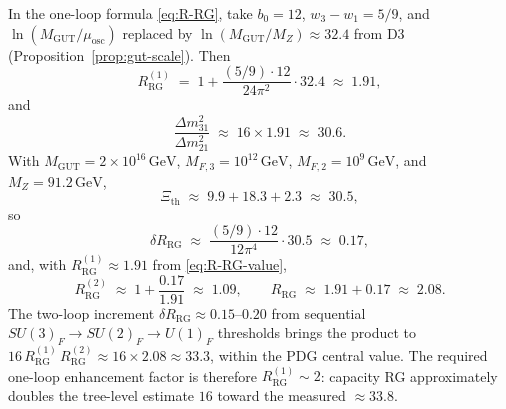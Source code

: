 \begin{proposition}
\label{prop:R-RG-numeric}
In the one-loop formula \eqref{eq:R-RG}, take $b_0=12$,
$w_3-w_1=5/9$, and $\ln(M_{\mathrm{GUT}}/\mu_{\mathrm{osc}})$ replaced by
$\ln(M_{\mathrm{GUT}}/M_Z)\approx 32.4$ from D3
(Proposition~\ref{prop:gut-scale}). Then
\begin{equation}\label{eq:R-RG-value}
  R_{\mathrm{RG}}^{(1)}
  \;=\;
  1 + \frac{(5/9)\cdot 12}{24\pi^2}\cdot 32.4
  \;\approx\;
  1.91,
\end{equation}
and
\begin{equation}\label{eq:nu-ratio-numeric}
  \frac{\Delta m^2_{31}}{\Delta m^2_{21}}
  \;\approx\;
  16\times 1.91
  \;\approx\;
  30.6.
\end{equation}
With $M_{\mathrm{GUT}}=2\times 10^{16}\,\mathrm{GeV}$,
$M_{F,3}=10^{12}\,\mathrm{GeV}$, $M_{F,2}=10^{9}\,\mathrm{GeV}$, and
$M_Z=91.2\,\mathrm{GeV}$,
\begin{equation}\label{eq:Xi-th-value}
  \Xi_{\mathrm{th}}
  \;\approx\;
  9.9 + 18.3 + 2.3
  \;\approx\;
  30.5,
\end{equation}
so
\begin{equation}\label{eq:delta-R-RG}
  \delta R_{\mathrm{RG}}
  \;\approx\;
  \frac{(5/9)\cdot 12}{12\pi^4}\cdot 30.5
  \;\approx\;
  0.17,
\end{equation}
and, with $R_{\mathrm{RG}}^{(1)}\approx 1.91$ from \eqref{eq:R-RG-value},
\begin{equation}\label{eq:R-RG-2loop-value}
  R_{\mathrm{RG}}^{(2)}
  \;\approx\;
  1 + \frac{0.17}{1.91}
  \;\approx\;
  1.09,
  \qquad
  R_{\mathrm{RG}}
  \;\approx\;
  1.91 + 0.17
  \;\approx\;
  2.08.
\end{equation}
The two-loop increment $\delta R_{\mathrm{RG}}\approx 0.15$--$0.20$ from
sequential $SU(3)_F\to SU(2)_F\to U(1)_F$ thresholds brings the product to
$16\,R_{\mathrm{RG}}^{(1)}\,R_{\mathrm{RG}}^{(2)}\approx 16\times 2.08
\approx 33.3$, within the PDG central value. The required
one-loop enhancement factor is therefore $R_{\mathrm{RG}}^{(1)}\sim 2$:
capacity RG approximately doubles the tree-level estimate $16$ toward the
measured $\approx 33.8$.
\end{proposition}

